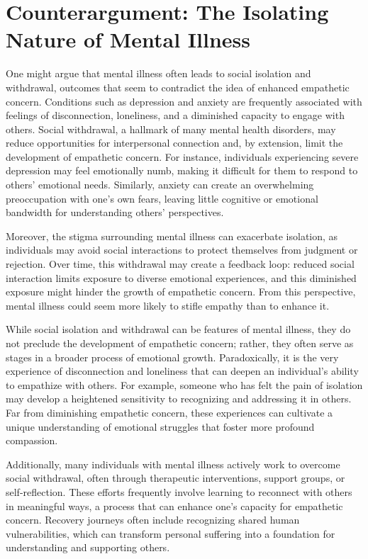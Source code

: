 \documentclass[stu]{apa7}
\begin{document}
\section{Counterargument: The Isolating Nature of Mental Illness}

One might argue that mental illness often leads to social isolation and withdrawal, outcomes that seem to contradict the idea of enhanced empathetic concern. Conditions such as depression and anxiety are frequently associated with feelings of disconnection, loneliness, and a diminished capacity to engage with others. Social withdrawal, a hallmark of many mental health disorders, may reduce opportunities for interpersonal connection and, by extension, limit the development of empathetic concern. For instance, individuals experiencing severe depression may feel emotionally numb, making it difficult for them to respond to others' emotional needs. Similarly, anxiety can create an overwhelming preoccupation with one's own fears, leaving little cognitive or emotional bandwidth for understanding others' perspectives.

Moreover, the stigma surrounding mental illness can exacerbate isolation, as individuals may avoid social interactions to protect themselves from judgment or rejection. Over time, this withdrawal may create a feedback loop: reduced social interaction limits exposure to diverse emotional experiences, and this diminished exposure might hinder the growth of empathetic concern. From this perspective, mental illness could seem more likely to stifle empathy than to enhance it.

While social isolation and withdrawal can be features of mental illness, they do not preclude the development of empathetic concern; rather, they often serve as stages in a broader process of emotional growth. Paradoxically, it is the very experience of disconnection and loneliness that can deepen an individual's ability to empathize with others. For example, someone who has felt the pain of isolation may develop a heightened sensitivity to recognizing and addressing it in others. Far from diminishing empathetic concern, these experiences can cultivate a unique understanding of emotional struggles that foster more profound compassion.

Additionally, many individuals with mental illness actively work to overcome social withdrawal, often through therapeutic interventions, support groups, or self-reflection. These efforts frequently involve learning to reconnect with others in meaningful ways, a process that can enhance one's capacity for empathetic concern. Recovery journeys often include recognizing shared human vulnerabilities, which can transform personal suffering into a foundation for understanding and supporting others.
\end{document}
